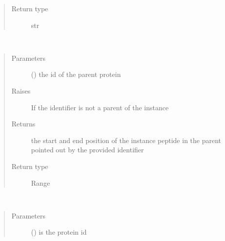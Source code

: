 \documentclass[letterpaper,10pt,english]{sphinxmanual}
\begin{document}
\begin{fulllineitems}
\begin{fulllineitems}
\begin{quote}
\begin{description}
\item[{Return type}] \leavevmode
str

\end{description}\end{quote}

\end{fulllineitems}


\begin{fulllineitems}
\label{\detokenize{IPTK.Classes:IPTK.Classes.Peptide.Peptide.get_pos_in_parent}}~\begin{quote}\begin{description}
\item[{Parameters}] \leavevmode
{} () \textendash{} the id of the parent protein

\item[{Raises}] \leavevmode
{} \textendash{} If the identifier is not a parent of the instance

\item[{Returns}] \leavevmode
the start and end position of the instance peptide in the parent pointed out by the provided identifier

\item[{Return type}] \leavevmode
Range

\end{description}\end{quote}

\end{fulllineitems}


\begin{fulllineitems}
\label{\detokenize{IPTK.Classes:IPTK.Classes.Peptide.Peptide.is_child_of}}~\begin{quote}\begin{description}
\item[{Parameters}] \leavevmode
{} () \textendash{} is the protein id


\end{description}
\end{quote}
\end{fulllineitems}
\end{fulllineitems}
\end{document}
